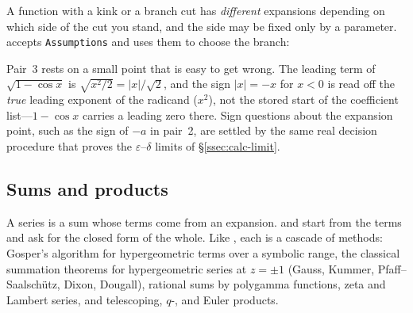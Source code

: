 A function with a kink or a branch cut has \emph{different} expansions depending on
which side of the cut you stand, and the side may be fixed only by a parameter.
 accepts \texttt{Assumptions} and uses them to
choose the branch:

\begin{codepairs}
\end{codepairs}

Pair~3 rests on a small point that is easy to get wrong. The leading term of
\(\sqrt{1-\cos x}\) is \(\sqrt{x^2/2}=\lvert x\rvert/\sqrt2\), and the sign
\(\lvert x\rvert = -x\) for \(x<0\) is read off the \emph{true} leading exponent of the
radicand (\(x^2\)), not the stored start of the coefficient list---\(1-\cos x\) carries
a leading zero there. Sign questions about the expansion point, such as the sign of
\(-a\) in pair~2, are settled by the same real decision procedure that proves the
\(\varepsilon\)--\(\delta\) limits of \S\ref{ssec:calc-limit}.

\subsection{Sums and products}
\label{ssec:calc-sums}

A series is a sum whose terms come from an expansion.  and 
start from the terms and ask for the closed form of the whole. Like ,
each is a cascade of methods: Gosper's algorithm for hypergeometric terms over a
symbolic range, the classical summation theorems for hypergeometric series at
\(z=\pm1\) (Gauss, Kummer, Pfaff--Saalsch\"utz, Dixon, Dougall), rational sums by
polygamma functions, zeta and Lambert series, and telescoping, \(q\)-, and Euler
products.

\begin{codepairs}
\end{codepairs}

